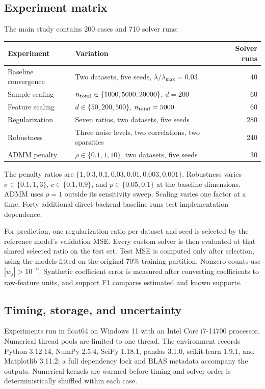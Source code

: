 \documentclass{article}
\begin{document}
\subsection{Experiment matrix}
The main study contains 200 cases and 710 solver runs:
\begin{center}
\small
\begin{tabular}{llr}
\toprule
Experiment & Variation & Solver runs\\
\midrule
Baseline convergence & Two datasets, five seeds, $\lambda/\lambda_{\max}=0.03$ & 40\\
Sample scaling & $n_{\rm total}\in\{1000,5000,20000\}$, $d=200$ & 60\\
Feature scaling & $d\in\{50,200,500\}$, $n_{\rm total}=5000$ & 60\\
Regularization & Seven ratios, two datasets, five seeds & 280\\
Robustness & Three noise levels, two correlations, two sparsities & 240\\
ADMM penalty & $\rho\in\{0.1,1,10\}$, two datasets, five seeds & 30\\
\bottomrule
\end{tabular}
\end{center}
The penalty ratios are $\{1,0.3,0.1,0.03,0.01,0.003,0.001\}$.
Robustness varies $\sigma\in\{0.1,1,3\}$, $c\in\{0.1,0.9\}$, and $p\in\{0.05,0.1\}$ at the baseline dimensions. ADMM uses $\rho=1$ outside its sensitivity sweep. Scaling varies one factor at a time. Forty additional direct-backend baseline runs test implementation dependence.

For prediction, one regularization ratio per dataset and seed is selected by the reference model's validation MSE. Every custom solver is then evaluated at that shared selected ratio on the test set. Test MSE is computed only after selection, using the models fitted on the original 70\% training partition. Nonzero counts use $|w_j|>10^{-6}$. Synthetic coefficient error is measured after converting coefficients to raw-feature units, and support F1 compares estimated and known supports.

\subsection{Timing, storage, and uncertainty}
Experiments run in float64 on Windows 11 with an Intel Core i7-14700 processor. Numerical thread pools are limited to one thread. The environment records Python 3.12.14, NumPy 2.5.4, SciPy 1.18.1, pandas 3.1.0, scikit-learn 1.9.1, and Matplotlib 3.11.2; a full dependency lock and BLAS metadata accompany the outputs. Numerical kernels are warmed before timing and solver order is deterministically shuffled within each case.
\end{document}

